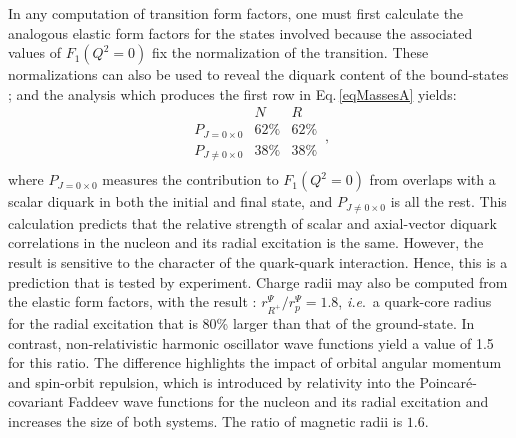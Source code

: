 In any computation of transition form factors, one must first calculate the analogous elastic form factors for the states involved because the associated values of $F_1(Q^2=0)$ fix the normalization of the transition.  These normalizations can also be used to reveal the diquark content of the bound-states \cite{Roberts:2013mja, Segovia:2014aza, Segovia:2015hra}; and the analysis which produces the first row in Eq.\,\eqref{eqMassesA} yields:
\begin{equation}
\label{Pdiquark}
\begin{array}{l|cc}
        & N    & R    \\\hline
P_{J=0 \times 0} & 62\% & 62\% \\
P_{J\neq 0 \times 0} & 38\% & 38\% \\
\end{array}\,,
\end{equation}
where $P_{J=0 \times 0}$ measures the contribution to $F_1(Q^2=0)$ from overlaps with a scalar diquark in both the initial and final state, and $P_{J\neq 0 \times 0}$ is all the rest.  This calculation predicts that the relative strength of scalar and axial-vector diquark correlations in the nucleon and its radial excitation is the same.  However, the result is sensitive to the character of the quark-quark interaction.  Hence, this is a prediction that is tested by experiment.
%
Charge radii may also be computed from the elastic form factors, with the result \cite{Segovia:2015hra}: $r^{ \Psi}_{R^+}/r_{p}^{\Psi}=1.8$, \emph{i.e}.\ a quark-core radius for the radial excitation that is 80\% larger than that of the ground-state.  In contrast, non-relativistic harmonic oscillator wave functions yield a value of 1.5 for this ratio.  The difference highlights the impact of orbital angular momentum and spin-orbit repulsion, which is introduced by relativity into the Poincar\'e-covariant Faddeev wave functions for the nucleon and its radial excitation and increases the size of both systems.
%
The ratio of magnetic radii is $1.6$.

